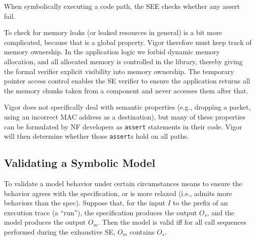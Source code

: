 \documentclass[letterpaper,twocolumn,10pt]{article}
\newcommand{\code}[1]{\lstinline{#1}}
\begin{document}
When symbolically executing a code path, the SEE checks whether any assert fail.

To check for memory leaks (or leaked resources in general) is a bit more
complicated, because that is a global property. Vigor therefore must keep track
of memory ownership. In the application logic we forbid dynamic memory
allocation, and all allocated memory is controlled in the library, thereby
giving the formal verifier explicit visibility into memory ownership. The
temporary pointer access control enables the SE verifier to ensure the
application returns all the memory chunks taken from a component and never
accesses them after that.

Vigor does not specifically deal with semantic properties (e.g., dropping a
packet, using an incorrect MAC address as a destination), but many of these
properties can be formulated by NF developers as \code{assert} statements in
their code. Vigor will then determine whether those \code{assert}s hold on all
paths.

\subsection{Validating a Symbolic Model}
\label{sec:model-validation-criteria}

To validate a model behavior under certain circumstances means to ensure the
behavior agrees with the specification, or is more relaxed (i.e., admits more
behaviors than the spec). Suppose that, for the input \(I\) to the prefix of an
execution trace (a ``run''), the specification produces the output $O_s$, and
the model produces the output \(O_m\). Then the model is valid iff for all call
sequences performed during the exhaustive SE, \(O_m\) contains \(O_s\).
\end{document}

